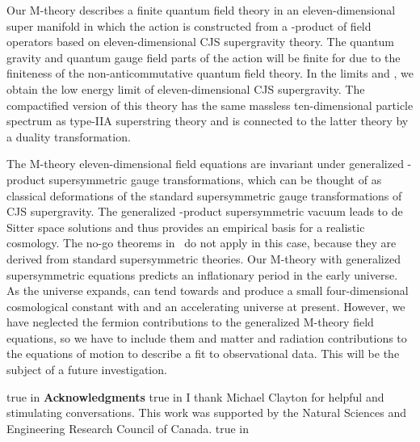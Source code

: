 \documentclass[a4paper,12pt]{article}
\begin{document}
Our M-theory describes a finite quantum field theory in an
eleven-dimensional super manifold in which the action is constructed from a
\myHighlight{$\diamondsuit$}\coordHE{}-product of field operators based on eleven-dimensional CJS
supergravity theory. The quantum gravity and quantum gauge field parts of
the action will be finite for \myHighlight{$\Lambda < \infty$}\coordHE{} due to the finiteness of
the non-anticommutative quantum field theory. In the limits
\myHighlight{$\Lambda\rightarrow\infty$}\coordHE{} and \coordHE{}, we obtain the low
energy limit of eleven-dimensional CJS supergravity. The compactified
version of this theory has the same massless ten-dimensional particle
spectrum as type-IIA superstring theory and is connected to the latter
theory by a duality transformation.

The M-theory eleven-dimensional field equations are invariant under
generalized \myHighlight{$\diamondsuit$}\coordHE{}-product supersymmetric gauge transformations,
which can be thought of as classical deformations of the standard
supersymmetric gauge transformations of CJS supergravity. The generalized
\myHighlight{$\diamond$}\coordHE{}-product supersymmetric vacuum leads to de Sitter space
solutions and thus provides an empirical basis for a realistic cosmology.
The no-go theorems in~\cite{Maldacena} do not apply in this case, because
they are derived from standard supersymmetric theories. Our M-theory with
generalized supersymmetric equations predicts an inflationary period in the
early universe. As the universe expands, \coordHE{} can tend towards \coordHE{} and produce a small four-dimensional cosmological constant
with \coordHE{} and an accelerating universe at present. However, we
have neglected the fermion contributions to the generalized M-theory field
equations, so we have to include them and matter and radiation
contributions to the equations of motion to describe a fit to observational
data. This will be the subject of a future investigation.

 true in
{\bf Acknowledgments}
 true in
I thank Michael Clayton for helpful and
stimulating conversations. This work was supported by
the Natural Sciences and Engineering Research Council of Canada.
 true in
\end{document}
